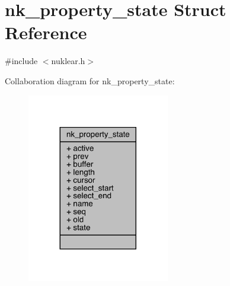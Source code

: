 \hypertarget{structnk__property__state}{}\section{nk\+\_\+property\+\_\+state Struct Reference}
\label{structnk__property__state}


{\ttfamily \#include $<$nuklear.\+h$>$}



Collaboration diagram for nk\+\_\+property\+\_\+state\+:
\nopagebreak
\begin{figure}[H]
\begin{center}
\leavevmode
\includegraphics[width=176pt]{structnk__property__state__coll__graph}
\end{center}
\end{figure}
